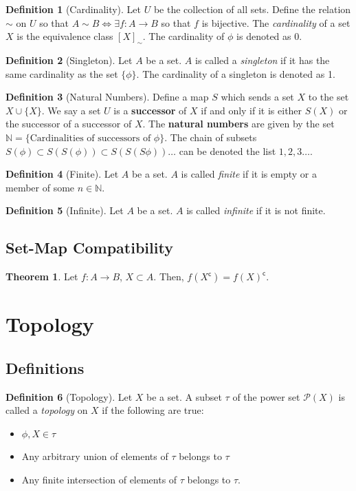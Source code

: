 \documentclass{article}
\theoremstyle{definition}
\newtheorem{definition}{Definition}[subsection]
\newtheorem{theorem}{Theorem}[subsection]
\begin{document}
\begin{definition}[Cardinality]
    Let $U$ be the collection of all sets. Define the relation $\sim$ on $U$ so that $A \sim B\iff \exists f:A\rightarrow B$ so that $f$ is bijective. The \textit{cardinality} of a set $X$ is the equivalence class $[X]_\sim$. The cardinality of $\phi$ is denoted as 0.
\end{definition}
\begin{definition}[Singleton]
    Let $A$ be a set. $A$ is called a \textit{singleton} if it has the same cardinality as the set $\{\phi\}$. The cardinality of a singleton is denoted as 1.
\end{definition}
\begin{definition}[Natural Numbers]
    Define a map $S$ which sends a set $X$ to the set $X\cup \{X\}$. We say a set $U$ is a \textbf{successor} of $X$ if and only if it is either $S(X)$ or the successor of a successor of $X$. The \textbf{natural numbers} are given by the set $\mathbb{N} = \{\text{Cardinalities of successors of } \phi\}$. The chain of subsets $S(\phi)\subset S(S(\phi))\subset S(S(S\phi))\ldots$ can be denoted the list $1,2,3\ldots$. 
\end{definition}
\begin{definition}[Finite]
    Let $A$ be a set. $A$ is called \textit{finite} if it is empty or a member of some $n\in \mathbb{N}$.
\end{definition}
\begin{definition}[Infinite]
    Let $A$ be a set. $A$ is called \textit{infinite} if it is not finite.
\end{definition}
\subsection{Set-Map Compatibility}
\begin{theorem}
    Let $f:A\rightarrow B$, $X\subset A$. Then, $f(X^\mathsf{c})=f(X)^\mathsf{c}$.
\end{theorem}
\noindent

\section{Topology}
\setcounter{subsection}{-1}
\subsection{Definitions}

    \begin{definition}[Topology]\label{sub:topology} Let $X$ be a set. A subset $\tau$ of the power set $\mathcal{P}(X)$ is called a \textit{topology} on $X$ if the following are true:
        \begin{itemize}
            \item $\phi,X \in \tau$
            \item Any arbitrary union of elements of $\tau$ belongs to $\tau$
            \item Any finite intersection of elements of $\tau$ belongs to $\tau$.
        \end{itemize}
    \end{definition}
\end{document}
